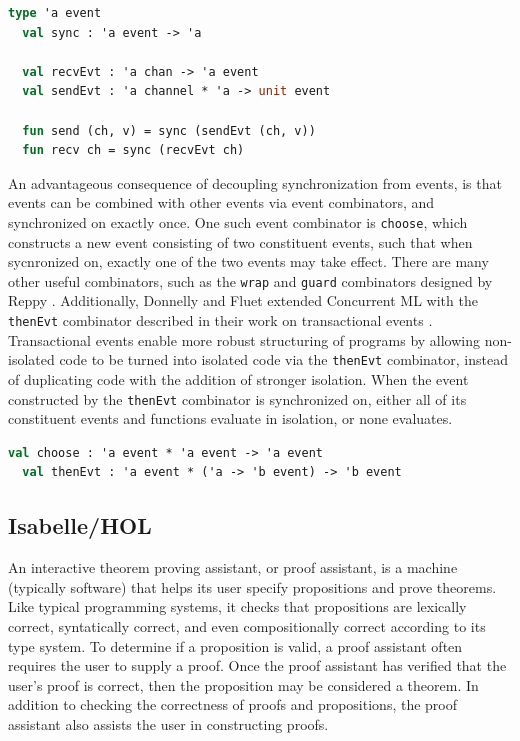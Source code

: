 \documentclass[letterpaper, 11pt]{report}
\begin{document}
\begin{lstlisting}[language=ML, mathescape]
  type 'a event
  val sync : 'a event -> 'a

  val recvEvt : 'a chan -> 'a event
  val sendEvt : 'a channel * 'a -> unit event

  fun send (ch, v) = sync (sendEvt (ch, v))
  fun recv ch = sync (recvEvt ch)
\end{lstlisting}

An advantageous consequence of decoupling synchronization from events, is that events can be
combined with other events via event combinators, and synchronized on exactly once. One such
event combinator is \lstinline{choose}, which constructs a new event consisting of two
constituent events, such that when sycnronized on, exactly one of the two events may take
effect. There are many other useful combinators, such as the \lstinline{wrap} and
\lstinline{guard} combinators designed by Reppy \cite{reppy2007specialization}.
Additionally, Donnelly and Fluet extended
Concurrent ML with the \lstinline{thenEvt} combinator described in their work on
transactional events \cite{donnelly2008transactional}. Transactional events enable more robust
structuring of programs by allowing non-isolated code to be turned into isolated code via
the \lstinline{thenEvt} combinator, instead of duplicating code with the addition of stronger
isolation. When the event constructed by the \lstinline{thenEvt} combinator is synchronized
on, either all of its constituent events and functions evaluate in isolation, or none
evaluates.

\begin{lstlisting}[language=ML, mathescape]
  val choose : 'a event * 'a event -> 'a event
  val thenEvt : 'a event * ('a -> 'b event) -> 'b event
  \end{lstlisting}


\subsection{Isabelle/HOL}
An interactive theorem proving assistant, or proof assistant, is a machine (typically software) that helps its user
specify propositions and prove theorems. Like typical programming systems, it checks
that propositions are lexically correct, syntatically correct, and
even compositionally correct according to its type system. To determine if a proposition is valid, a proof assistant
often requires the user to supply a proof. Once the proof assistant has verified that the user's proof is correct,
then the proposition may be considered a theorem. In addition to checking the correctness of proofs and
propositions, the proof assistant also assists the user in constructing proofs.
\end{document}
